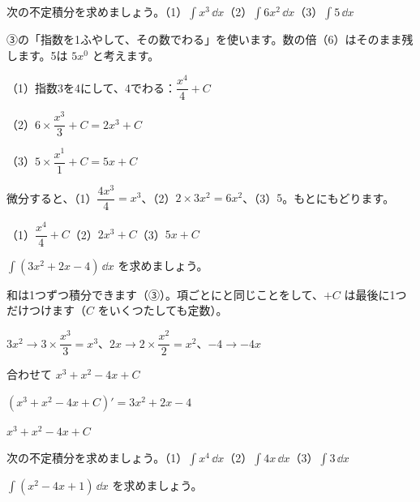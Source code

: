 
\begin{reidai}[$x^n$ と定数の不定積分]
次の不定積分を求めましょう。\quad（1）$\displaystyle\int x^3\,\dd x$\quad（2）$\displaystyle\int6x^2\,\dd x$\quad（3）$\displaystyle\int5\,\dd x$\par
\kangaekata ③の「指数を1ふやして、その数でわる」を使います。数の倍（6）はそのまま残します。5は $5x^0$ と考えます。\par
\shiki（1）\nobreak 指数3を4にして、4でわる：$\dfrac{x^4}{4}+C$\par
\hspace*{2.6\zw}（2）\nobreak $6\times\dfrac{x^3}{3}+C=2x^3+C$\par
\hspace*{2.6\zw}（3）\nobreak $5\times\dfrac{x^1}{1}+C=5x+C$\par
{}微分すると、（1）$\dfrac{4x^3}{4}=x^3$、（2）$2\times3x^2=6x^2$、（3）$5$。もとにもどります。\par
\kotae（1）\nobreak $\dfrac{x^4}{4}+C$\quad（2）\nobreak $2x^3+C$\quad（3）\nobreak $5x+C$
\end{reidai}

\begin{reidai}[項がいくつかある不定積分]
$\displaystyle\int(3x^2+2x-4)\,\dd x$ を求めましょう。\par
\kangaekata 和は1つずつ積分できます（③）。項ごとにと同じことをして、$+C$ は最後に1つだけつけます（$C$ をいくつたしても定数）。\par
\shiki $3x^2\to3\times\dfrac{x^3}{3}=x^3$、\quad$2x\to2\times\dfrac{x^2}{2}=x^2$、\quad$-4\to-4x$\par
\hspace*{2.6\zw}合わせて $x^3+x^2-4x+C$\par
{}$(x^3+x^2-4x+C)'=3x^2+2x-4$\par
\kotae $x^3+x^2-4x+C$
\end{reidai}

\noindent\begin{minipage}[t]{0.485\linewidth}\vspace{0pt}\raggedright
\begin{jibun}
次の不定積分を求めましょう。\quad（1）$\displaystyle\int x^4\,\dd x$\quad（2）$\displaystyle\int4x\,\dd x$\quad（3）$\displaystyle\int3\,\dd x$
\end{jibun}
\end{minipage}\hfill
\begin{minipage}[t]{0.485\linewidth}\vspace{0pt}\raggedright
\begin{jibun}
$\displaystyle\int(x^2-4x+1)\,\dd x$ を求めましょう。
\end{jibun}
\end{minipage}


